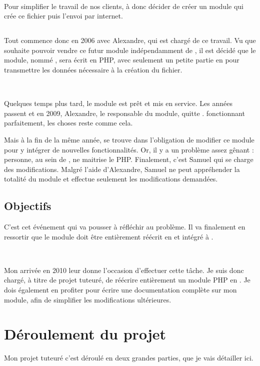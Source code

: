 ~

Pour simplifier le travail de nos clients, \solulog{} à donc décider de créer un module qui crée ce fichier puis l'envoi par internet.

\subsection{\pireus}
Tout commence donc en 2006 avec Alexandre, qui est chargé de ce travail. Vu que \solulog{} souhaite pouvoir vendre ce futur module indépendamment de \integrale, il est décidé que le module, nommé \emph{\pireus}, sera écrit en PHP, avec seulement un petite partie en \vb{} pour transmettre les données nécessaire à la création du fichier.

~

Quelques temps plus tard, le module est prêt et mis en service. Les années passent et en 2009, Alexandre, le responsable du module, quitte \solulog. \pireus fonctionnant parfaitement, les choses reste comme cela.

Mais à la fin de la même année, \solulog{} se trouve dans l'obligation de modifier ce module pour y intégrer de nouvelles fonctionnalités. Or, il y a un problème assez gênant : personne, au sein de \solulog, ne maitrise le PHP. Finalement, c'est Samuel qui se charge des modifications. Malgré l'aide d'Alexandre, Samuel ne peut appréhender la totalité du module et effectue seulement les modifications demandées.

\vfill

\subsection{Objectifs}
C'est cet événement qui va pousser \solulog{} à réfléchir au problème. Il va finalement en ressortir que le module doit être entièrement réécrit en \vb{} et intégré à \integrale.

~

Mon arrivée en 2010 leur donne l'occasion d'effectuer cette tâche. Je suis donc chargé, à titre de projet tuteuré, de réécrire entièrement un module PHP en \vb. Je dois également en profiter pour écrire une documentation complète sur mon module, afin de simplifier les modifications ultérieures.

\section{Déroulement du projet}
Mon projet tuteuré c'est déroulé en deux grandes parties, que je vais détailler ici.

